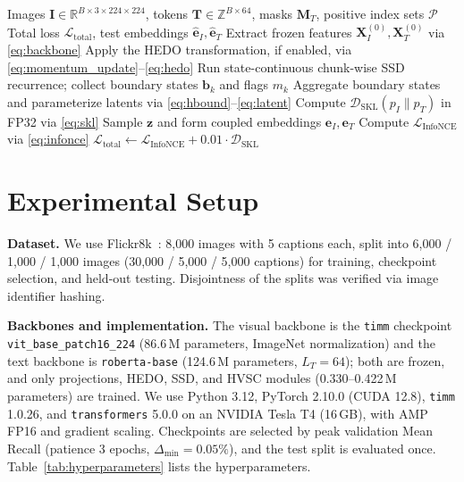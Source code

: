\documentclass[pdflatex,sn-mathphys-num]{sn-jnl}
\begin{document}
\begin{algorithm}[!htbp]
\caption{HEDO-HVSC forward pass and training step}
\label{alg:hedo_hvsc}
\begin{algorithmic}[1]
\Require Images $\mathbf{I} \in \mathbb{R}^{B \times 3 \times 224 \times 224}$, tokens $\mathbf{T} \in \mathbb{Z}^{B \times 64}$, masks $\mathbf{M}_T$, positive index sets $\mathcal{P}$
\Ensure Total loss $\mathcal{L}_{\text{total}}$, test embeddings $\hat{\mathbf{e}}_I, \hat{\mathbf{e}}_T$
\State Extract frozen features $\mathbf{X}_I^{(0)}, \mathbf{X}_T^{(0)}$ via \eqref{eq:backbone}
\State Apply the HEDO transformation, if enabled, via \eqref{eq:momentum_update}--\eqref{eq:hedo}
\State Run state-continuous chunk-wise SSD recurrence; collect boundary states $\mathbf{b}_k$ and flags $m_k$
\State Aggregate boundary states and parameterize latents via \eqref{eq:hbound}--\eqref{eq:latent}
\State Compute $\mathcal{D}_{\text{SKL}}(p_I \parallel p_T)$ in FP32 via \eqref{eq:skl}
\State Sample $\mathbf{z}$ and form coupled embeddings $\mathbf{e}_I, \mathbf{e}_T$
\State Compute $\mathcal{L}_{\text{InfoNCE}}$ via \eqref{eq:infonce}
\State \Return $\mathcal{L}_{\text{total}} \gets \mathcal{L}_{\text{InfoNCE}} + 0.01 \cdot \mathcal{D}_{\text{SKL}}$
\end{algorithmic}
\end{algorithm}

\section{Experimental Setup}
\label{sec:experimental_setup}

\textbf{Dataset.} We use Flickr8k~\cite{hodosh2013framing}: 8,000 images with 5 captions each, split into 6,000 / 1,000 / 1,000 images (30,000 / 5,000 / 5,000 captions) for training, checkpoint selection, and held-out testing. Disjointness of the splits was verified via image identifier hashing.

\textbf{Backbones and implementation.} The visual backbone is the \texttt{timm} checkpoint \texttt{vit\_base\_}\allowbreak\texttt{patch16\_224} (86.6\,M parameters, ImageNet normalization) and the text backbone is \texttt{roberta-base} (124.6\,M parameters, $L_T=64$); both are frozen, and only projections, HEDO, SSD, and HVSC modules (0.330--0.422\,M parameters) are trained. We use Python 3.12, PyTorch 2.10.0 (CUDA 12.8), \texttt{timm} 1.0.26, and \texttt{transformers} 5.0.0 on an NVIDIA Tesla T4 (16\,GB), with AMP FP16 and gradient scaling. Checkpoints are selected by peak validation Mean Recall (patience 3 epochs, $\Delta_{\text{min}}=0.05\%$), and the test split is evaluated once. Table~\ref{tab:hyperparameters} lists the hyperparameters.
\end{document}
